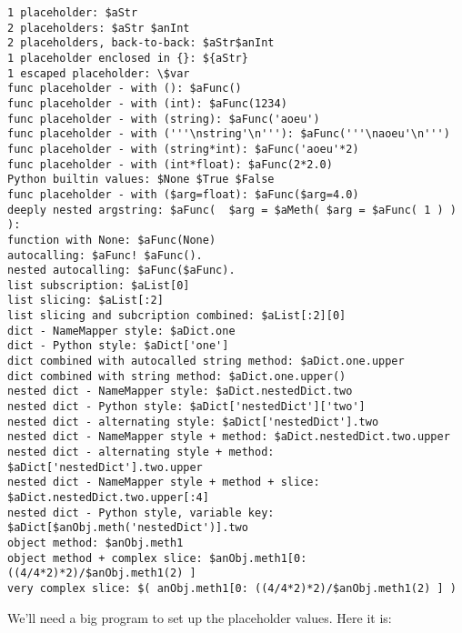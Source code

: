 \begin{verbatim}
1 placeholder: $aStr
2 placeholders: $aStr $anInt
2 placeholders, back-to-back: $aStr$anInt
1 placeholder enclosed in {}: ${aStr}
1 escaped placeholder: \$var
func placeholder - with (): $aFunc()
func placeholder - with (int): $aFunc(1234)
func placeholder - with (string): $aFunc('aoeu')
func placeholder - with ('''\nstring'\n'''): $aFunc('''\naoeu'\n''')
func placeholder - with (string*int): $aFunc('aoeu'*2)
func placeholder - with (int*float): $aFunc(2*2.0)
Python builtin values: $None $True $False
func placeholder - with ($arg=float): $aFunc($arg=4.0)
deeply nested argstring: $aFunc(  $arg = $aMeth( $arg = $aFunc( 1 ) ) ):
function with None: $aFunc(None)
autocalling: $aFunc! $aFunc().
nested autocalling: $aFunc($aFunc).
list subscription: $aList[0]
list slicing: $aList[:2]
list slicing and subcription combined: $aList[:2][0]
dict - NameMapper style: $aDict.one
dict - Python style: $aDict['one']
dict combined with autocalled string method: $aDict.one.upper
dict combined with string method: $aDict.one.upper()
nested dict - NameMapper style: $aDict.nestedDict.two
nested dict - Python style: $aDict['nestedDict']['two']
nested dict - alternating style: $aDict['nestedDict'].two
nested dict - NameMapper style + method: $aDict.nestedDict.two.upper
nested dict - alternating style + method: $aDict['nestedDict'].two.upper
nested dict - NameMapper style + method + slice: $aDict.nestedDict.two.upper[:4]
nested dict - Python style, variable key: $aDict[$anObj.meth('nestedDict')].two
object method: $anObj.meth1
object method + complex slice: $anObj.meth1[0: ((4/4*2)*2)/$anObj.meth1(2) ]
very complex slice: $( anObj.meth1[0: ((4/4*2)*2)/$anObj.meth1(2) ] )
\end{verbatim}

We'll need a big program to set up the placeholder values.  Here it is:

